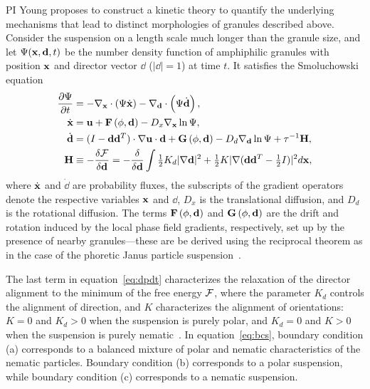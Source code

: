 %
PI Young proposes to construct a kinetic theory to quantify the
underlying mechanisms that lead to distinct morphologies of granules
described above. Consider the suspension on a length scale much longer
than the granule size, and let $\Psi({\mathbf{x}}, {\mathbf{d}},t)$ be the number
density function of amphiphilic granules with position $\mathbf{x}$ and
director vector ${\dd}$ ($|\dd|=1$) at time $t$. It satisfies the
Smoluchowski equation 
\begin{align}
  \frac{\partial \Psi}{\partial t} &= -\nabla_{\mathbf{x}}
  \cdot\left(\Psi\dot{\mathbf{x}}\right)
  - \nabla_{\mathbf{d}}\cdot\left(\Psi \dot{\mathbf{d}}\right),\\
\dot{\mathbf{x}} &= {\mathbf{u}} + {\mathbf{F}}\left(\phi,{\mathbf{d}}\right) -
  D_x\nabla_{\mathbf{x}}\ln\Psi,\\
\label{eq:dpdt}
\dot{\mathbf{d}} &= (I-{\mathbf{d}}{\mathbf{d}}^T)\cdot\nabla {\mathbf{u}}\cdot {\mathbf{d}} + {\bf
  G}\left(\phi,{\mathbf{d}}\right) - D_d \nabla_{\mathbf{d}}\ln \Psi + \tau^{-1}{\bf H},\\
    {\bf H} &\equiv -\frac{\delta {\cal F}}{\delta {\mathbf{d}}}
    = -\frac{\delta}{\delta {\mathbf{d}}} 
    \int 
    \tfrac{1}{2}K_d |\nabla{\mathbf{d}}|^2 + \tfrac{1}{2}K|\nabla({\mathbf{d}}{\mathbf{d}}^T-
    \tfrac{1}{2}I)|^2 d{\mathbf{x}},
\end{align}
where $\dot{\mathbf{x}}$ and $\dot\dd$ are probability fluxes, the subscripts of
the gradient operators denote the respective variables $\mathbf{x}$ and $\dd$,
$D_x$ is the translational diffusion, and $D_d$ is the rotational
diffusion.  The terms ${\mathbf{F}}\left(\phi,{\mathbf{d}}\right)$ and ${\bf
G}\left(\phi,{\mathbf{d}}\right)$ are the drift and rotation induced by the
local phase field gradients, respectively, set up by the presence of
nearby granules---these are be derived using the reciprocal theorem as
in the case of the phoretic Janus particle
suspension~\cite{TraversoMichellin2020_PRF, TraversoMichellin2022_JFM}.

The last term in equation~\eqref{eq:dpdt} characterizes the relaxation
of the director alignment to the minimum of the free energy ${\cal F}$,
where the parameter $K_d$ controls the alignment of direction, and $K$
characterizes the alignment of orientations: $K=0$ and $K_d > 0$ when
the suspension is purely polar, and $K_d=0$ and $K>0$ when the
suspension is purely nematic~\cite{Amiri2022_JPhysA}. 
%
In equation~\eqref{eq:bcs}, boundary condition (a) corresponds to a
balanced mixture of polar and nematic characteristics of the nematic
particles. Boundary condition (b) corresponds to a polar suspension,
while boundary condition (c) corresponds to a nematic suspension. 

